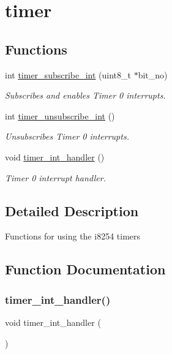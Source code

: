 \hypertarget{group__timer}{}\section{timer}
\label{group__timer}
\subsection*{Functions}
\begin{DoxyCompactItemize}
\item 
int \mbox{\hyperlink{group__timer_ga6f786481e80308348d629d605ffa2d84}{timer\+\_\+subscribe\+\_\+int}} (uint8\+\_\+t $\ast$bit\+\_\+no)
\begin{DoxyCompactList}\small\item\em Subscribes and enables Timer 0 interrupts. \end{DoxyCompactList}\item 
int \mbox{\hyperlink{group__timer_gab9eea51549744bca5c5c923b388bb4ee}{timer\+\_\+unsubscribe\+\_\+int}} ()
\begin{DoxyCompactList}\small\item\em Unsubscribes Timer 0 interrupts. \end{DoxyCompactList}\item 
void \mbox{\hyperlink{group__timer_ga10fc9c867b15c7da6649311c9987cd17}{timer\+\_\+int\+\_\+handler}} ()
\begin{DoxyCompactList}\small\item\em Timer 0 interrupt handler. \end{DoxyCompactList}\end{DoxyCompactItemize}


\subsection{Detailed Description}
Functions for using the i8254 timers 

\subsection{Function Documentation}
\mbox{\label{group__timer_ga10fc9c867b15c7da6649311c9987cd17}} 
\subsubsection{\texorpdfstring{timer\+\_\+int\+\_\+handler()}{timer\_int\_handler()}}
{\footnotesize\ttfamily void timer\+\_\+int\+\_\+handler (\begin{DoxyParamCaption}{ }\end{DoxyParamCaption})}



